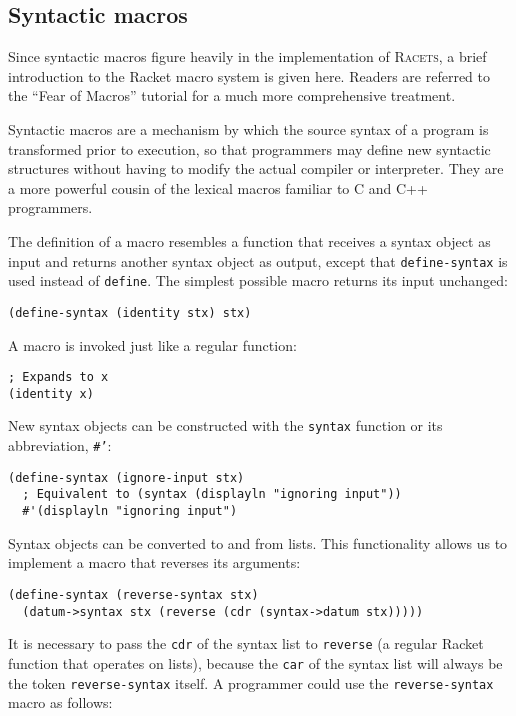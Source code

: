 \documentclass{article}
\begin{document}
\subsection{Syntactic macros}
Since syntactic macros figure heavily in the implementation of \textsc{Racets}, a brief introduction to the Racket macro system is given here. Readers are referred to the ``Fear of Macros'' tutorial \cite{fear-of-macros} for a much more comprehensive treatment.

Syntactic macros are a mechanism by which the source syntax of a program is transformed prior to execution, so that programmers may define new syntactic structures without having to modify the actual compiler or interpreter. They are a more powerful cousin of the lexical macros familiar to C and C++ programmers.

The definition of a macro resembles a function that receives a syntax object as input and returns another syntax object as output, except that \texttt{define-syntax} is used instead of \texttt{define}. The simplest possible macro returns its input unchanged:

\begin{lstlisting}
(define-syntax (identity stx) stx)
\end{lstlisting}

A macro is invoked just like a regular function:

\begin{lstlisting}
; Expands to x
(identity x)
\end{lstlisting}

New syntax objects can be constructed with the \texttt{syntax} function or its abbreviation, \texttt{\#'}:

\begin{lstlisting}
(define-syntax (ignore-input stx)
  ; Equivalent to (syntax (displayln "ignoring input"))
  #'(displayln "ignoring input")
\end{lstlisting}

Syntax objects can be converted to and from lists. This functionality allows us to implement a macro that reverses its arguments:

\begin{lstlisting}
(define-syntax (reverse-syntax stx)
  (datum->syntax stx (reverse (cdr (syntax->datum stx)))))
\end{lstlisting}

It is necessary to pass the \texttt{cdr} of the syntax list to \texttt{reverse} (a regular Racket function that operates on lists), because the \texttt{car} of the syntax list will always be the token \texttt{reverse-syntax} itself. A programmer could use the \texttt{reverse-syntax} macro as follows:
\end{document}
